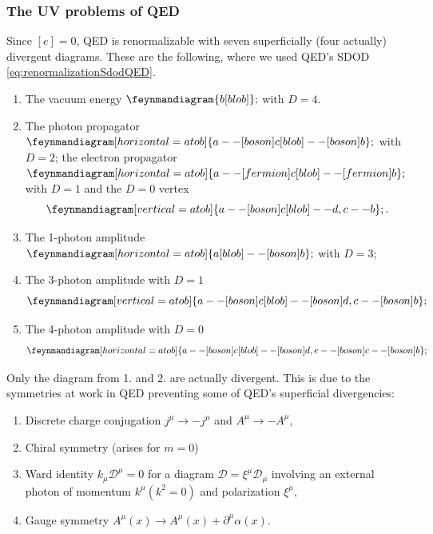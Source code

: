 \subsubsection{The UV problems of QED}
Since $[e]=0$, QED is renormalizable with seven superficially (four actually) divergent diagrams. These are the following, where we used QED's SDOD \ref{eq:renormalizationSdodQED}.
\begin{enumerate}
	\item The vacuum energy $\feynmandiagram{b[blob]};$ with $D=4$.
	\item The photon propagator $\feynmandiagram[horizontal=a to b]{a--[boson] c[blob] -- [boson]b};$ with $D=2$; the electron propagator $\feynmandiagram[horizontal=a to b]{a --[fermion]c[blob] --[fermion]b};$ with $D=1$ and the $D=0$ vertex
	\begin{equation}
		\feynmandiagram[vertical=a to b]{a -- [boson] c [blob] -- d, c--b};.
	\end{equation}
	\item The 1-photon amplitude $\feynmandiagram[horizontal=a to b]{a[blob]--[boson]b};$ with $D=3$;
	\item The 3-photon amplitude with $D=1$
	\begin{equation}
	\feynmandiagram[vertical=a to b]{a -- [boson] c [blob] -- [boson] d, c --[boson] b};
	\end{equation}
	\item The 4-photon amplitude with $D=0$
	\begin{equation}
		\feynmandiagram[horizontal=a to b]{a--[boson] c [blob] -- [boson] d, e --[boson]c--[boson] b};
	\end{equation}
\end{enumerate}
Only the diagram from 1. and 2. are actually divergent. This is due to the symmetries at work in QED preventing some of QED's superficial divergencies:
\begin{enumerate}
	\item Discrete charge conjugation $j^{\mu} \rightarrow - j^{\mu}$ and $A^{\mu} \rightarrow - A^{\mu}$,
	\item Chiral symmetry (arises for $m=0$)
	\item Ward identity $k_{\mu}\mathcal{D}^{\mu} =0$ for a diagram $\mathcal{D}= \xi^{\mu} \mathcal{D}_{\mu}$ involving an external photon of momentum $k^{\mu} ( k^2 =0)$ and polarization $\xi^{\mu}$,
	\item Gauge symmetry $A^{\mu}(x) \rightarrow A^{\mu}(x) + \partial^{\mu} \alpha(x)$.
\end{enumerate}
